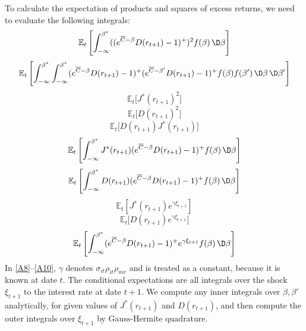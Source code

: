 \begin{appendices}
To calculate the expectation of products and squares of excess returns, we need to evaluate the following integrals:
\begin{equation} 
    \mathbb{E}_t\left[\int_{-\infty}^{\beta^*} ((e^{\overline{C}-\beta}  D(r_{t+1}) - 1)^+)^2 f(\beta)\,\D \beta\right]
    \end{equation}
\begin{equation}
    \mathbb{E}_t\left[\int_{-\infty}^{\beta^*} \int_{-\infty}^{\beta^*} (e^{\overline{C}-\beta}  D(r_{t+1}) - 1)^+ (e^{ \overline{C}-\beta'} D(r_{t+1}) - 1)^+f(\beta)f(\beta')\,\D \beta \,\D \beta'\right]
\end{equation}
\begin{equation}
    \mathbb{E}_t\big[J^*(r_{t+1})^2\big] 
    \end{equation}
\begin{equation}
    \mathbb{E}_t\big[D(r_{t+1})^2\big] 
    \end{equation}
\begin{equation}
    \mathbb{E}_t\big[D(r_{t+1}) J^*(r_{t+1})\big]
    \end{equation}
\begin{equation}
    \mathbb{E}_t\left[\int_{-\infty}^{\beta^*} J^*(r_{t+1}) (e^{\overline{C}-\beta}  D(r_{t+1}) - 1)^+f(\beta)\,\D \beta\right]
    \end{equation}
\begin{equation}
    \mathbb{E}_t\left[\int_{-\infty}^{\beta^*} D(r_{t+1}) (e^{\overline{C}-\beta}  D(r_{t+1}) - 1)^+f(\beta)\,\D \beta\right]
    \end{equation}
\begin{equation}\label{A8}
    \mathbb{E}_t\left[J^*(r_{t+1}) e^{\gamma \xi_{t+1}}\right]
    \end{equation}
\begin{equation}\label{A9}
    \mathbb{E}_t\big[D(r_{t+1}) e^{\gamma \xi_{t+1}}\big]
    \end{equation}
\begin{equation} \label{A10} 
    \mathbb{E}_t\left[\int_{-\infty}^{\beta^*} (e^{\overline{C}-\beta}  D(r_{t+1}) - 1)^+ e^{\gamma \xi_{t+1}}f(\beta)\,\D \beta\right]
\end{equation}
In \eqref{A8}--\eqref{A10}, $\gamma$ denotes $\sigma_{it}\rho_{it}\rho_{mr}$ and is treated as a constant, because it is known at date $t$. The conditional expectations are all integrals over the shock $\xi_{t+1}$ to the interest rate at date $t+1$. We compute any inner integrals over $\beta, \beta'$ analytically, for given values of $J^*(r_{t+1})$ and $D(r_{t+1})$, and then compute the outer integrals over $\xi_{t+1}$ by Gauss-Hermite quadrature.



\end{appendices}
